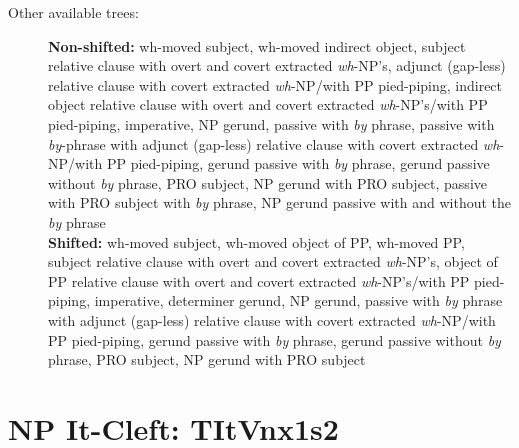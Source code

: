 \begin{description}
\item[Other available trees:] {\bf Non-shifted:} wh-moved subject, wh-moved
indirect object, subject relative clause with overt and covert extracted
{\it wh}-NP's, adjunct (gap-less) relative clause with covert extracted
{\it wh}-NP/with PP pied-piping, indirect object relative clause with overt
and covert extracted {\it wh}-NP's/with PP pied-piping, imperative, NP
gerund, passive with {\it by} phrase, passive with {\it by}-phrase with
adjunct (gap-less) relative clause with covert extracted {\it wh}-NP/with
PP pied-piping, gerund passive with {\it by} phrase, gerund passive without
{\it by} phrase, PRO subject, NP gerund with PRO subject, passive with PRO
subject with {\it by} phrase, NP gerund passive with and without the {\it
by} phrase\\ {\bf Shifted:} wh-moved subject, wh-moved object of PP,
wh-moved PP, subject relative clause with overt and covert extracted {\it
wh}-NP's, object of PP relative clause with overt and covert extracted {\it
wh}-NP's/with PP pied-piping, imperative, determiner gerund, NP gerund,
passive with {\it by} phrase with adjunct (gap-less) relative clause with
covert extracted {\it wh}-NP/with PP pied-piping, gerund passive with {\it
by} phrase, gerund passive without {\it by} phrase, PRO subject, NP gerund
with PRO subject
\end{description}




\section{NP It-Cleft: TItVnx1s2}
\label{ItVnx1s2-family}


